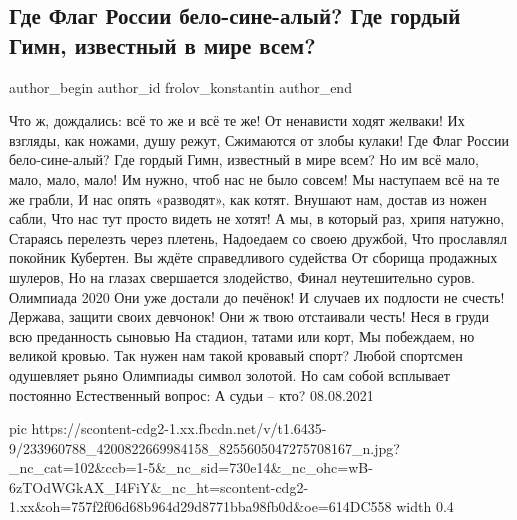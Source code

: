  
 
 
 
 
 
\subsection{Где Флаг России бело-сине-алый? Где гордый Гимн, известный в мире всем?}
\label{sec:08_08_2021.fb.frolov_konstantin.1.olimpiada_rossia_poezia}
 
\ifcmt
 author_begin
   author_id frolov_konstantin
 author_end
\fi

\begin{multicols}{2}
\obeycr
Что ж, дождались: всё то же и всё те же!
От ненависти ходят желваки!
Их взгляды, как ножами, душу режут,
Сжимаются от злобы  кулаки!
\smallskip
Где Флаг России бело-сине-алый?
Где гордый Гимн, известный в мире всем?
Но им всё мало, мало, мало, мало!
Им нужно, чтоб нас не было совсем!
\smallskip
Мы наступаем всё на те же грабли,
И нас опять «разводят», как котят.
Внушают нам, достав из ножен сабли,
Что нас тут просто видеть не хотят!
\smallskip
А мы, в который раз, хрипя натужно,
Стараясь перелезть через плетень,
Надоедаем со своею дружбой,
Что прославлял покойник Кубертен.
\smallskip
Вы ждёте справедливого судейства
От сборища продажных шулеров,
Но на глазах свершается злодейство,
Финал неутешительно суров.
\smallskip
Олимпиада 2020
\smallskip
Они уже достали до печёнок!
И случаев их подлости не счесть!
Держава, защити своих девчонок!
Они ж твою отстаивали честь!
\smallskip
Неся в груди всю преданность сыновью
На стадион, татами или корт,
Мы побеждаем, но великой кровью.
Так нужен нам такой кровавый спорт?
\smallskip
Любой спортсмен одушевляет рьяно
Олимпиады символ золотой.
Но сам собой всплывает постоянно
Естественный вопрос: А судьи – кто?
                 08.08.2021
\restorecr
\end{multicols}

\ifcmt
  pic https://scontent-cdg2-1.xx.fbcdn.net/v/t1.6435-9/233960788_4200822669984158_8255605047275708167_n.jpg?_nc_cat=102&ccb=1-5&_nc_sid=730e14&_nc_ohc=wB-6zTOdWGkAX_I4FiY&_nc_ht=scontent-cdg2-1.xx&oh=757f2f06d68b964d29d8771bba98fb0d&oe=614DC558
  width 0.4
\fi

